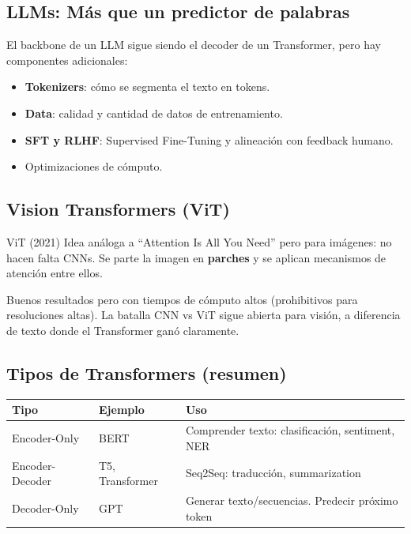 \documentclass[12pt, a4paper]{article}
\begin{document}
\subsection{LLMs: Más que un predictor de palabras}

El backbone de un LLM sigue siendo el decoder de un Transformer, pero hay componentes adicionales:
\begin{itemize}
	\item \textbf{Tokenizers}: cómo se segmenta el texto en tokens.
	\item \textbf{Data}: calidad y cantidad de datos de entrenamiento.
	\item \textbf{SFT y RLHF}: Supervised Fine-Tuning y alineación con feedback humano.
	\item Optimizaciones de cómputo.
\end{itemize}

\subsection{Vision Transformers (ViT)}

\begin{defbox}{ViT (2021)}
	Idea análoga a ``Attention Is All You Need'' pero para imágenes: no hacen falta CNNs. Se parte la imagen en \textbf{parches} y se aplican mecanismos de atención entre ellos.

	Buenos resultados pero con tiempos de cómputo altos (prohibitivos para resoluciones altas). La batalla CNN vs ViT sigue abierta para visión, a diferencia de texto donde el Transformer ganó claramente.
\end{defbox}

\subsection{Tipos de Transformers (resumen)}

\begin{center}
	\begin{tabular}{llp{6cm}}
		\toprule
		\textbf{Tipo}   & \textbf{Ejemplo} & \textbf{Uso}                                     \\
		\midrule
		Encoder-Only    & BERT             & Comprender texto: clasificación, sentiment, NER  \\
		Encoder-Decoder & T5, Transformer  & Seq2Seq: traducción, summarization               \\
		Decoder-Only    & GPT              & Generar texto/secuencias. Predecir próximo token \\
		\bottomrule
	\end{tabular}
\end{center}
\end{document}
